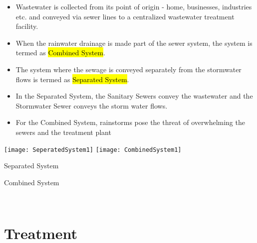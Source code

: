 \begin{itemize}
\item Wastewater is collected from its point of origin - home, businesses, industries etc. and conveyed via sewer lines to a centralized wastewater treatment facility.  
\item When the rainwater drainage is made part of the sewer system, the system is termed as \hl{Combined System}.  
\item The system where the sewage is conveyed separately from the stormwater flows is termed as \hl{Separated System}.  
\item In the Separated System, the Sanitary Sewers convey the wastewater and the Stormwater Sewer conveys the storm water flows.  
\item For the Combined System, rainstorms pose the threat of overwhelming the sewers and the treatment plant
\end{itemize}  
\begin{center}
\texttt{[image: SeperatedSystem1]} \hspace{1 cm} \texttt{[image: CombinedSystem1]}
\end{center}
			\hspace{2.6cm} Separated System \hspace{3.2cm} \parbox{\textwidth}{Combined System}\\

\section{Treatment}
